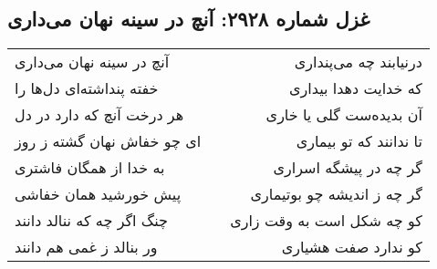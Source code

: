 \begin{center}
\section*{غزل شماره ۲۹۲۸: آنچ در سینه نهان می‌داری}
\label{sec:2928}
\begin{longtable}{l p{0.5cm} r}
آنچ در سینه نهان می‌داری
&&
درنیابند چه می‌پنداری
\\
خفته پنداشته‌ای دل‌ها را
&&
که خدایت دهدا بیداری
\\
هر درخت آنچ که دارد در دل
&&
آن بدیده‌ست گلی یا خاری
\\
ای چو خفاش نهان گشته ز روز
&&
تا ندانند که تو بیماری
\\
به خدا از همگان فاشتری
&&
گر چه در پیشگه اسراری
\\
پیش خورشید همان خفاشی
&&
گر چه ز اندیشه چو بوتیماری
\\
چنگ اگر چه که ننالد دانند
&&
کو چه شکل است به وقت زاری
\\
ور بنالد ز غمی هم دانند
&&
کو ندارد صفت هشیاری
\\
\end{longtable}
\end{center}

